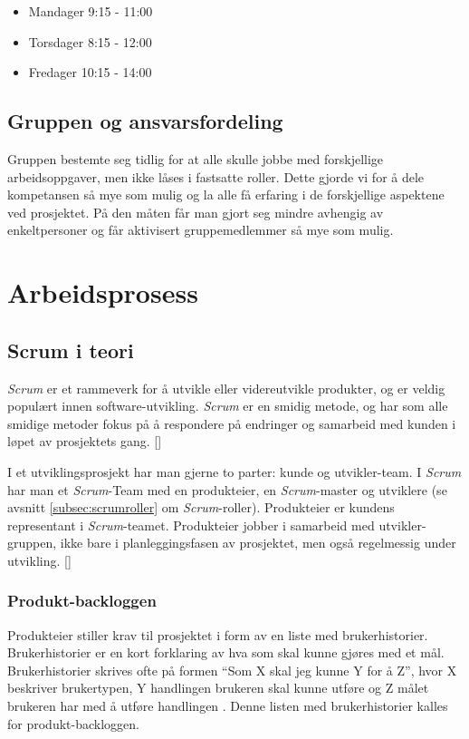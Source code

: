 \documentclass[12pt,a4paper,norsk]{article}
\begin{document}
\begin{itemize}
  \item[] Mandager 9:15 - 11:00
  \item[] Torsdager 8:15 - 12:00
  \item[] Fredager 10:15 - 14:00
\end{itemize}

\subsection{Gruppen og ansvarsfordeling}
Gruppen bestemte seg tidlig for at alle skulle jobbe med forskjellige arbeidsoppgaver, men ikke låses i fastsatte roller. Dette gjorde vi for å dele kompetansen så mye som mulig og la alle få erfaring i de forskjellige aspektene ved prosjektet. På den måten får man gjort seg mindre avhengig av enkeltpersoner og får aktivisert gruppemedlemmer så mye som mulig.

  \section{Arbeidsprosess}
  \subsection{Scrum i teori}
  \textit{Scrum} er et rammeverk for å utvikle eller videreutvikle produkter, og er veldig populært innen software-utvikling. \textit{Scrum} er en smidig metode, og har som alle smidige metoder fokus på å respondere på endringer og samarbeid med kunden i løpet av prosjektets gang. [\cite{agilemanifesto}]

  I et utviklingsprosjekt har man gjerne to parter: kunde og utvikler-team. I \textit{Scrum} har man et \textit{Scrum}-Team med en produkteier, en \textit{Scrum}-master og utviklere (se avsnitt \cref{subsec:scrumroller} om \textit{Scrum}-roller). Produkteier er kundens representant i \textit{Scrum}-teamet. Produkteier jobber i samarbeid med utvikler-gruppen, ikke bare i planleggingsfasen av prosjektet, men også regelmessig under utvikling.
  [\cite{scrumguides}]
  \subsubsection{Produkt-backloggen}
  Produkteier stiller krav til prosjektet i form av en liste med brukerhistorier. Brukerhistorier er en kort forklaring av hva som skal kunne gjøres med et mål.  Brukerhistorier skrives ofte på formen “Som X skal jeg kunne Y for å Z”, hvor X beskriver brukertypen, Y handlingen brukeren skal kunne utføre og Z målet brukeren har med å utføre handlingen \cite[side 9]{kniberg}. Denne listen med brukerhistorier kalles for produkt-backloggen.
\end{document}
